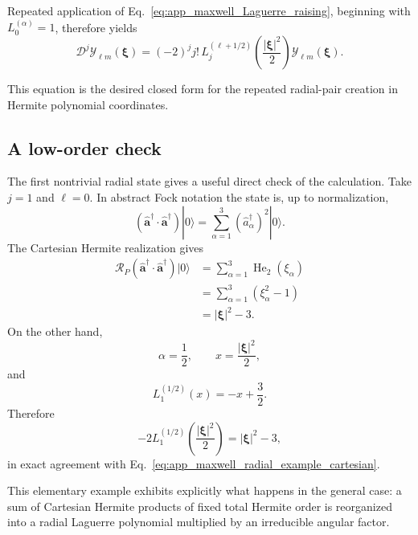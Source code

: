 \documentclass[11pt,oneside]{article}
\numberwithin{equation}{section}
\theoremstyle{definition}
\begin{document}
Repeated application of
Eq.~\eqref{eq:app_maxwell_Laguerre_raising}, beginning with
$L_0^{(\alpha)}=1$, therefore yields
\begin{equation}
\mathcal D^j
\mathcal Y_{\ell m}(\bm\xi)
=
(-2)^j j!\,
L_j^{(\ell+1/2)}
\left(
\frac{|\bm\xi|^2}{2}
\right)
\mathcal Y_{\ell m}(\bm\xi).
\label{eq:app_maxwell_pair_to_Laguerre}
\end{equation}

This equation is the desired closed form for the repeated radial-pair
creation in Hermite polynomial coordinates.

\subsection{A low-order check}

The first nontrivial radial state gives a useful direct check of the
calculation.  Take $j=1$ and $\ell=0$.  In abstract Fock notation the state
is, up to normalization,
\begin{equation}
\left(
\hat{\bm a}^\dagger\cdot
\hat{\bm a}^\dagger
\right)|0\rangle
=
\sum_{\alpha=1}^{3}
(\hat a_\alpha^\dagger)^2|0\rangle .
\end{equation}
The Cartesian Hermite realization gives
\begin{align}
\mathcal R_P
\left(
\hat{\bm a}^\dagger\cdot
\hat{\bm a}^\dagger
\right)|0\rangle
&=
\sum_{\alpha=1}^{3}
\operatorname{He}_2(\xi_\alpha)
\nonumber\\
&=
\sum_{\alpha=1}^{3}
(\xi_\alpha^2-1)
\nonumber\\
&=
|\bm\xi|^2-3.
\label{eq:app_maxwell_radial_example_cartesian}
\end{align}
On the other hand,
\begin{equation}
\alpha=\frac12,
\qquad
x=\frac{|\bm\xi|^2}{2},
\end{equation}
and
\begin{equation}
L_1^{(1/2)}(x)
=
-x+\frac32.
\end{equation}
Therefore
\begin{equation}
-2L_1^{(1/2)}
\left(
\frac{|\bm\xi|^2}{2}
\right)
=
|\bm\xi|^2-3,
\label{eq:app_maxwell_radial_example_Laguerre}
\end{equation}
in exact agreement with
Eq.~\eqref{eq:app_maxwell_radial_example_cartesian}.

This elementary example exhibits explicitly what happens in the general
case: a sum of Cartesian Hermite products of fixed total Hermite order is
reorganized into a radial Laguerre polynomial multiplied by an irreducible
angular factor.
\end{document}
